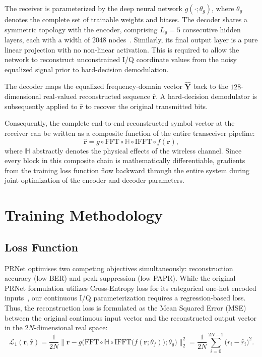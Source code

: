 The receiver is parameterized by the deep neural network $g(\cdot; \theta_g)$, where $\theta_g$ denotes the complete set of trainable weights and biases. The decoder shares a symmetric topology with the encoder, comprising $L_g = 5$ consecutive hidden layers, each with a width of 2048 nodes~\cite{kim2017novel}. Similarly, its final output layer is a pure linear projection with no non-linear activation. This is required to allow the network to reconstruct unconstrained I/Q coordinate values from the noisy equalized signal prior to hard-decision demodulation.

The decoder maps the equalized frequency-domain vector $\hat{\bm{Y}}$ back to the $128$-dimensional real-valued reconstructed sequence $\hat{\bm{r}}$. A hard-decision demodulator is subsequently applied to $\hat{\bm{r}}$ to recover the original transmitted bits.

Consequently, the complete end-to-end reconstructed symbol vector at the receiver can be written as a composite function of the entire transceiver pipeline:
\begin{equation*}
    \hat{\bm{r}} = g \circ \mathrm{FFT} \circ \mathbb{H} \circ \mathrm{IFFT} \circ f(\bm{r}),
\end{equation*}
where $\mathbb{H}$ abstractly denotes the physical effects of the wireless channel. Since every block in this composite chain is mathematically differentiable, gradients from the training loss function flow backward through the entire system during joint optimization of the encoder and decoder parameters.

\section{Training Methodology}
\label{sec:training}

\subsection{Loss Function}

PRNet optimises two competing objectives simultaneously: reconstruction accuracy (low BER) and peak suppression (low PAPR). While the original PRNet formulation utilizes Cross-Entropy loss for its categorical one-hot encoded inputs~\cite{kim2017novel}, our continuous I/Q parameterization requires a regression-based loss. Thus, the reconstruction loss is formulated as the Mean Squared Error (MSE) between the original continuous input vector and the reconstructed output vector in the $2N$-dimensional real space:
\begin{equation*}
    \mathcal{L}_1(\bm{r},\hat{\bm{r}})
    = \frac{1}{2N}\bigl\|\bm{r} - g\bigl(\mathrm{FFT} \circ \mathbb{H} \circ \mathrm{IFFT}\bigl(f(\bm{r}; \theta_f)\bigr); \theta_g\bigr)\bigr\|_2^2
    = \frac{1}{2N}\sum_{i=0}^{2N-1}\bigl(r_i - \hat{r}_i\bigr)^2.
\end{equation*}

